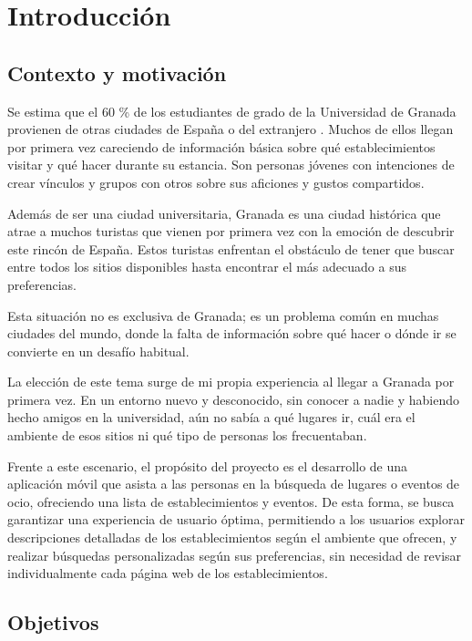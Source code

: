 \chapter{Introducción}
\section{Contexto y motivación}

Se estima que el 60 \% de los estudiantes de grado de la Universidad de Granada provienen de otras ciudades de
España o del extranjero \cite{ugr}. Muchos de ellos llegan por primera vez careciendo de información básica sobre qué
establecimientos visitar y qué hacer durante su estancia. Son personas jóvenes con intenciones de crear vínculos
y grupos con otros sobre sus aficiones y gustos compartidos.

Además de ser una ciudad universitaria, Granada es una ciudad histórica que atrae a muchos turistas que vienen
por primera vez con la emoción de descubrir este rincón de España. Estos turistas enfrentan el obstáculo de
tener que buscar entre todos los sitios disponibles hasta encontrar el más adecuado a sus preferencias.

Esta situación no es exclusiva de Granada; es un problema común en muchas ciudades del mundo, donde la falta de
información sobre qué hacer o dónde ir se convierte en un desafío habitual.

La elección de este tema surge de mi propia experiencia al llegar a Granada por primera vez. En un entorno nuevo
y desconocido, sin conocer a nadie y habiendo hecho amigos en la universidad, aún no sabía a qué lugares ir,
cuál era el ambiente de esos sitios ni qué tipo de personas los frecuentaban.

Frente a este escenario, el propósito del proyecto es el desarrollo de una aplicación móvil que asista a las
personas en la búsqueda de lugares o eventos de ocio, ofreciendo una lista de establecimientos y eventos. De
esta forma, se busca garantizar una experiencia de usuario óptima, permitiendo a los usuarios explorar
descripciones detalladas de los establecimientos según el ambiente que ofrecen, y realizar búsquedas
personalizadas según sus preferencias, sin necesidad de revisar individualmente cada página web de los
establecimientos.


\section{Objetivos}

